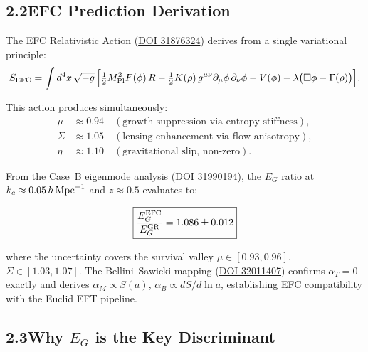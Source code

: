 \documentclass[11pt]{article}
\begin{document}
\subsection{2.2\quad EFC Prediction Derivation}

The EFC Relativistic Action
(\href{https://doi.org/10.6084/m9.figshare.31876324}{DOI 31876324})
derives from a single variational principle:
\begin{equation}
S_{\rm EFC} = \int d^4x\,\sqrt{-g}\,\Bigl[
\tfrac{1}{2}M_{\rm Pl}^2 F(\phi)\,R
- \tfrac{1}{2}K(\rho)\,g^{\mu\nu}\partial_\mu\phi\,\partial_\nu\phi
- V(\phi) - \lambda\bigl(\Box\phi - \Gamma(\rho)\bigr)
\Bigr].
\label{eq:action}
\end{equation}

This action produces simultaneously:
\begin{align}
\mu &\approx 0.94 \quad (\text{growth suppression via entropy stiffness}),\\
\Sigma &\approx 1.05 \quad (\text{lensing enhancement via flow anisotropy}),\\
\eta &\approx 1.10 \quad (\text{gravitational slip, non-zero}).
\end{align}

From the Case~B eigenmode analysis
(\href{https://doi.org/10.6084/m9.figshare.31990194}{DOI 31990194}),
the $E_G$ ratio at $k_c \approx 0.05\,h\,{\rm Mpc}^{-1}$ and
$z \approx 0.5$ evaluates to:

\begin{equation}
\boxed{
\frac{E_G^{\rm EFC}}{E_G^{\rm GR}} = 1.086 \pm 0.012
}
\label{eq:prediction}
\end{equation}

where the uncertainty covers the survival valley
$\mu \in [0.93, 0.96]$, $\Sigma \in [1.03, 1.07]$.
The Bellini--Sawicki mapping
(\href{https://doi.org/10.6084/m9.figshare.32011407}{DOI 32011407})
confirms $\alpha_T = 0$ exactly and derives
$\alpha_M \propto S(a)$, $\alpha_B \propto dS/d\ln a$,
establishing EFC compatibility with the Euclid EFT pipeline.

\subsection{2.3\quad Why $E_G$ is the Key Discriminant}
\end{document}
